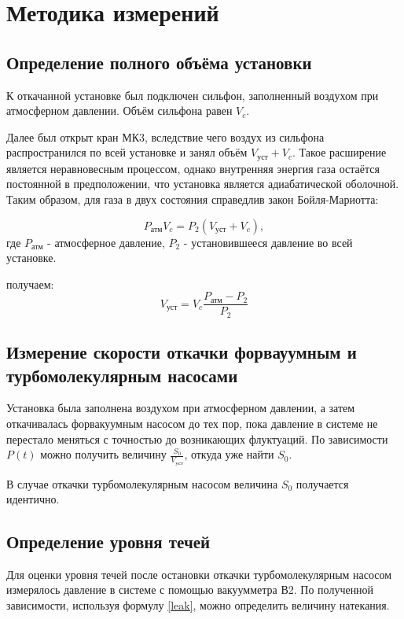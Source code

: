 \documentclass[15pt,a5paper,reqno]{article}
\begin{document}
\section{Методика измерений}
    
    \subsection{Определение полного объёма установки}
    
    К откачанной установке был подключен сильфон, заполненный воздухом при атмосферном давлении. Объём сильфона равен $V_c$.
    
    Далее был открыт кран МК3, вследствие чего воздух из сильфона распространился по всей установке и занял объём $V_{\text{уст}} + V_c$. Такое расширение является неравновесным процессом, однако внутренняя энергия газа остаётся постоянной в предположении, что установка является адиабатической оболочной. Таким образом, для газа в двух состояния справедлив закон Бойля-Мариотта:
    
    \begin{equation}
        P_{\text{атм}}V_c = P_2(V_{\text{уст}} + V_c),
    \end{equation}
    где $P_{\text{атм}}$ -  атмосферное давление, $P_2$ - установившееся давление во всей установке. 
    
     получаем:
    \begin{equation}
        V_{\text{уст}} = V_c\frac{P_{\text{атм}} - P_2}{P_2}
    \end{equation}
    
    \subsection{Измерение скорости откачки форвауумным и турбомолекулярным насосами}
     
    Установка была заполнена воздухом при атмосферном давлении, а затем откачивалась форвакуумным насосом до тех пор, пока давление в системе не перестало меняться с точностью до возникающих флуктуаций. По зависимости $P(t)$ можно получить величину $\frac{S_0}{V_{\text{уст}}}$, откуда уже найти $S_0$.
    
    В случае откачки турбомолекулярным насосом величина $S_0$ получается идентично.
    
    \subsection{Определение уровня течей}
    Для оценки уровня течей после остановки откачки турбомолекулярным насосом измерялось давление в системе с помощью вакуумметра В2. По полученной зависимости, используя формулу \eqref{leak}, можно определить величину натекания.
    
\end{document}
